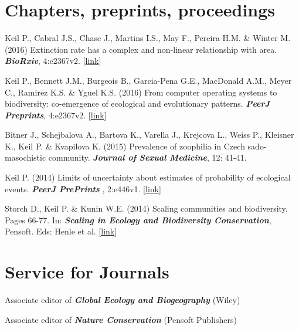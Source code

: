 \HRule

\section{Chapters, preprints, proceedings}
\begin{etaremune} 

\item Keil P., Cabral J.S., Chase J., Martins I.S., May F., Pereira H.M. \& Winter M. (2016) Extinction rate has a complex and non-linear relationship with area. \textit{\textbf{BioRxiv}}, 4:e2367v2. [\href{http://biorxiv.org/content/early/2016/10/18/081489}{link}]

\item Keil P., Bennett J.M., Burgeois B., Garcia-Pena G.E., MacDonald A.M., Meyer C., Ramirez K.S. \& Yguel K.S. (2016) From computer operating systems to biodiversity: co-emergence of ecological and evolutionary patterns. \textit{\textbf{PeerJ Preprints}}, 4:e2367v2. [\href{https://peerj.com/preprints/2367/}{link}]

\item Bitner J., Schejbalova A., Bartova K., Varella J., Krejcova L., Weiss P., Kleisner K., Keil P. \& Kvapilova K. (2015) Prevalence of zoophilia in Czech sado-masochistic community. \textit{\textbf{Journal of Sexual Medicine}}, 12: 41-41.

\item Keil P. (2014) Limits of uncertainty about estimates of probability of ecological events. \textit{\textbf{PeerJ PrePrints }}, 2:e446v1. [\href{https://peerj.com/preprints/446/}{link}]

\item Storch D., Keil P. \& Kunin W.E. (2014) Scaling communities and biodiversity. Pages 66-77. In: \textit{\textbf{Scaling in Ecology and Biodiversity Conservation}}, Pensoft. Eds: Henle et al. [\href{http://ab.pensoft.net/articles.php?id=1169}{link}]
 
\end{etaremune}

\HRule

\section{Service for Journals}

Associate editor of \textit{\textbf{Global Ecology and Biogeography}} (Wiley)

\medskip

Associate editor of \textit{\textbf{Nature Conservation}} (Pensoft Publishers) \\
\medskip

